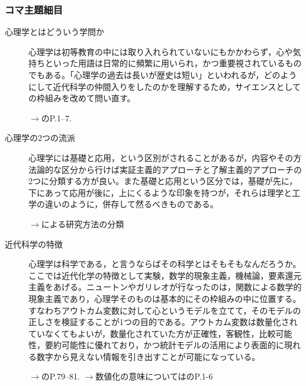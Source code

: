 \subsubsection{コマ主題細目}
\begin{description}

\item[心理学とはどういう学問か] 心理学は初等教育の中には取り入れられていないにもかかわらず，心や気持ちといった用語は日常的に頻繁に用いられ，かつ重要視されているものでもある。「心理学の過去は長いが歴史は短い」といわれるが，どのようにして近代科学の仲間入りをしたのかを理解するため，サイエンスとしての枠組みを改めて問い直す。
\begin{flushright}
    $\to$\citet{三浦201705}のP.1--7.
\end{flushright}


\item[心理学の2つの流派] 心理学には基礎と応用，という区別がされることがあるが，内容やその方法論的な区分から行けば実証主義的アプローチと了解主義的アプローチの2つに分類する方が良い。また基礎と応用という区分では，基礎が先に，下にあって応用が後に，上にくるような印象を持つが，それらは理学と工学の違いのように，併存して然るべきものである。
\begin{flushright}
    $\to$\citet{下山2001}による研究方法の分類
\end{flushright}

\item[近代科学の特徴] 心理学は科学である，と言うならばその科学とはそもそもなんだろうか。ここでは近代化学の特徴として実験，数学的現象主義，機械論，要素還元主義をあげる。ニュートンやガリレオが行なったのは，関数による数学的現象主義であり，心理学そのものは基本的にその枠組みの中に位置する。すなわちアウトカム変数に対して心というモデルを立てて，そのモデルの正しさを検証することが1つの目的である。アウトカム変数は数量化されていなくてもよいが，数量化されていた方が正確性，客観性，比較可能性，要約可能性に優れており，かつ統計モデルの活用により表面的に現れる数字から見えない情報を引き出すことが可能になっている。
\begin{flushright}
    $\to$\citet{三浦201705}のP.79--81.
    $\to$数値化の意味については\citet{川端201408}のP.1-6
\end{flushright}


\end{description}
